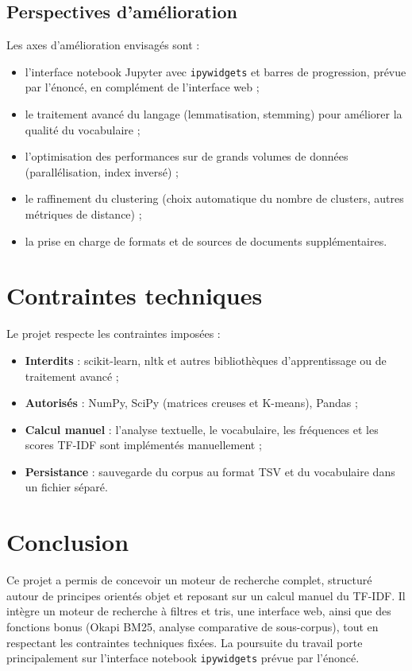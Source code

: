 \documentclass[12pt,a4paper]{article}
\begin{document}
\subsection{Perspectives d'amélioration}

Les axes d'amélioration envisagés sont :
\begin{itemize}
    \item l'interface notebook Jupyter avec \texttt{ipywidgets} et barres de progression, prévue par l'énoncé, en complément de l'interface web ;
    \item le traitement avancé du langage (lemmatisation, stemming) pour améliorer la qualité du vocabulaire ;
    \item l'optimisation des performances sur de grands volumes de données (parallélisation, index inversé) ;
    \item le raffinement du clustering (choix automatique du nombre de clusters, autres métriques de distance) ;
    \item la prise en charge de formats et de sources de documents supplémentaires.
\end{itemize}

\section{Contraintes techniques}

Le projet respecte les contraintes imposées :
\begin{itemize}
    \item \textbf{Interdits} : scikit-learn, nltk et autres bibliothèques d'apprentissage ou de traitement avancé ;
    \item \textbf{Autorisés} : NumPy, SciPy (matrices creuses et K-means), Pandas ;
    \item \textbf{Calcul manuel} : l'analyse textuelle, le vocabulaire, les fréquences et les scores TF-IDF sont implémentés manuellement ;
    \item \textbf{Persistance} : sauvegarde du corpus au format TSV et du vocabulaire dans un fichier séparé.
\end{itemize}

\section{Conclusion}

Ce projet a permis de concevoir un moteur de recherche complet, structuré autour de principes orientés objet et reposant sur un calcul manuel du TF-IDF. Il intègre un moteur de recherche à filtres et tris, une interface web, ainsi que des fonctions bonus (Okapi BM25, analyse comparative de sous-corpus), tout en respectant les contraintes techniques fixées. La poursuite du travail porte principalement sur l'interface notebook \texttt{ipywidgets} prévue par l'énoncé.
\end{document}
